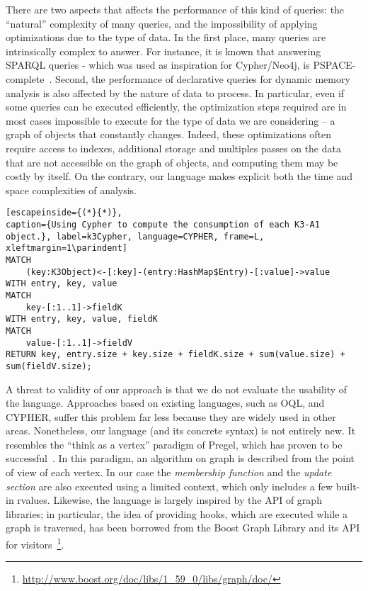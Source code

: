 There are two aspects that affects the performance of this kind of queries: the ``natural'' complexity of many queries, and the impossibility of applying optimizations due to the type of data. 
In the first place, many queries are intrinsically complex to answer.
For instance, it is known that answering SPARQL queries - which was used as inspiration for Cypher/Neo4j, is PSPACE-complete~\cite{Schmidt:2010:FSQ:1804669.1804675, Perez:2009:SCS:1567274.1567278}.
Second, the performance of declarative queries for dynamic memory analysis is also affected by the nature of data to process. 
In particular, even if some queries can be executed efficiently, the optimization steps required are in most cases impossible to execute for the type of data we are considering -- a graph of objects that constantly changes.
Indeed, these optimizations often require access to indexes, additional storage and multiples passes on the data~\cite{Elhemali:2007:ESS:1247480.1247598, Dageville:2002:SMM:1287369.1287454} that are not accessible on the graph of objects, and computing them may be costly by itself.
On the contrary, our language makes explicit both the time and space complexities of analysis.

\begin{lstlisting}[escapeinside={(*}{*)},
caption={Using Cypher to compute the consumption of each K3-A1 object.}, label=k3Cypher, language=CYPHER, frame=L, xleftmargin=1\parindent]
MATCH 
	(key:K3Object)<-[:key]-(entry:HashMap$Entry)-[:value]->value
WITH entry, key, value
MATCH 
	key-[:1..1]->fieldK
WITH entry, key, value, fieldK
MATCH 
	value-[:1..1]->fieldV
RETURN key, entry.size + key.size + fieldK.size + sum(value.size) + sum(fieldV.size);
\end{lstlisting}

A threat to validity of our approach is that we do not evaluate the usability of the language.
Approaches based on existing languages, such as OQL, and CYPHER, suffer this problem far less because they are widely used in other areas.
Nonetheless, our language (and its concrete syntax) is not entirely new.
It resembles the ``think as a vertex'' paradigm of Pregel, which has proven to be successful~\cite{Malewicz:2010:PSL:1807167.1807184}.
In this paradigm, an algorithm on graph is described from the point of view of each vertex.
In our case the \textit{membership function} and the \textit{update section} are also executed using a limited context, which only includes a few built-in rvalues.
Likewise, the language is largely inspired by the API of graph libraries; in particular, the idea of providing hooks, which are executed while a graph is traversed, has been borrowed from the Boost Graph Library and its API for visitors~\footnote{\url{http://www.boost.org/doc/libs/1_59_0/libs/graph/doc/}}.



